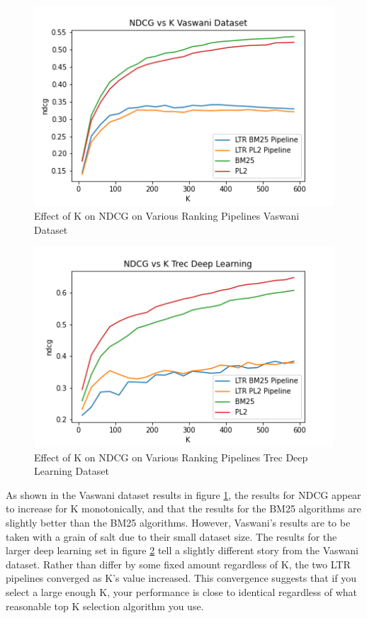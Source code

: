 \documentclass[letterpaper,12pt]{article}
\begin{document}
\begin{figure}[h!]
    \centering  %
    \includegraphics[width=.81\textwidth]{NDCG-vs-K-Vaswani-Dataset.png} %
    \caption{Effect of K on NDCG on Various Ranking Pipelines Vaswani Dataset} %
    \label{fig:ex_ndcg_vaswani} %
\end{figure}

\begin{figure}[h!]
    \centering  %
    \includegraphics[width=.81\textwidth]{NDCG-vs-K-Trec-Deep-Learning.png} %
    \caption{Effect of K on NDCG on Various Ranking Pipelines Trec Deep Learning Dataset} %
    \label{fig:ex_ndcg_deep} %
\end{figure}

As shown in the Vaswani dataset results in figure \ref{fig:ex_ndcg_vaswani}, the results for NDCG appear to increase for K monotonically, and that the results for the BM25 algorithms are slightly better than the BM25 algorithms.
However, Vaswani's results are to be taken with a grain of salt due to their small dataset size.
The results for the larger deep learning set in figure \ref{fig:ex_ndcg_deep} tell a slightly different story from the Vaswani dataset.
Rather than differ by some fixed amount regardless of K, the two LTR pipelines converged as K's value increased.
This convergence suggests that if you select a large enough K, your performance is close to identical regardless of what reasonable top K selection algorithm you use.
\end{document}

